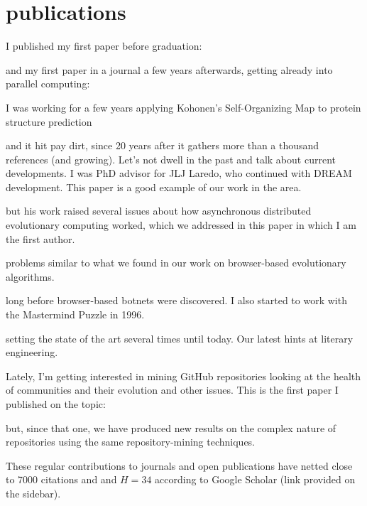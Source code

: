 \documentclass[]{friggeri-jj-cv}
\begin{document}
\section{publications}

I published my first paper before graduation: 

\cite{merelo88} 
and my first paper in a journal a few years
afterwards, getting already into parallel computing:

\cite{parallel90}
I was working for a few years applying Kohonen's Self-Organizing Map to protein structure prediction

\cite{jjproteng} 
and it hit pay dirt, since 20 years after it gathers more than a
thousand references (and growing). Let's not dwell in the past
and talk about current developments. I was PhD advisor for JLJ Laredo,
who continued with DREAM development. This paper is a good example of
our work in the area.

\cite{evag:gpem}
but his work raised several issues about how asynchronous distributed
evolutionary computing worked, which we addressed in this paper in
which I am the first author.

\cite{jj:2008:PPSN}
problems similar to what we found in our work on browser-based
evolutionary algorithms.

\cite{agajaj}
long before browser-based botnets were discovered. I also started to
work with the Mastermind Puzzle in 1996.

\cite{jj-ppsn96}
setting the state of the art several times until today. Our latest hints at 
literary engineering.

\cite{2014arXiv1403.3084G}

Lately, I'm getting interested in mining GitHub repositories looking
at the health of communities and their evolution and other
issues. This is the first paper I published on the topic:

\cite{2016arXiv160107862M}

but, since that one, we have produced new results on the complex
nature of repositories using the same repository-mining techniques.

These regular contributions to journals and open publications have
netted close to 7000 citations and and $H=34$ according to Google Scholar (link provided on
the sidebar).

\end{document}

